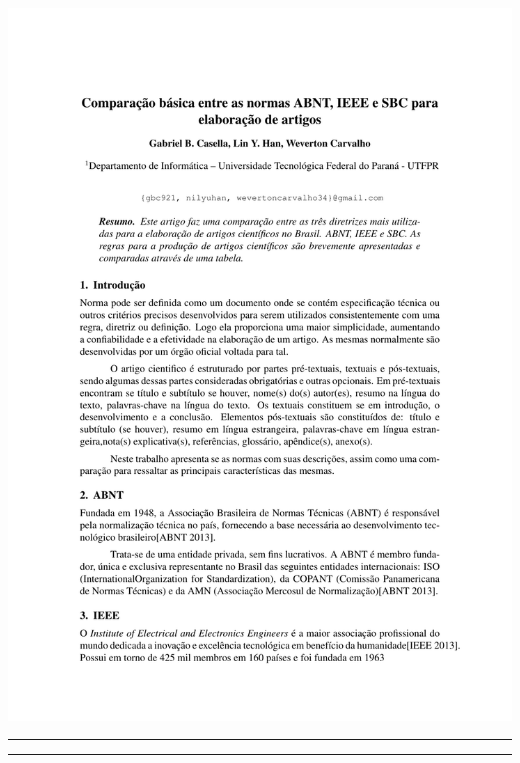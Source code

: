 {\noindent\includegraphics[trim=0 15cm 0 0,clip]{contents/intro_writing_conference/intro_writing_sbc}

\clearpage}
\restoregeometry


{\clearpage
\label{referencias}


\hrule


\hrule

\clearpage}
\restoregeometry

